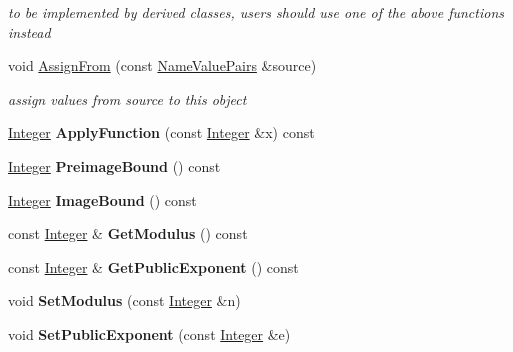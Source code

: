 \begin{DoxyCompactItemize}
\begin{DoxyCompactList}\small\item\em to be implemented by derived classes, users should use one of the above functions instead \item\end{DoxyCompactList}\item 
void \hyperlink{class_e_s_i_g_n_function_a1ff8229ed7786a13a69d15e5a64e4d21}{AssignFrom} (const \hyperlink{class_name_value_pairs}{NameValuePairs} \&source)
\begin{DoxyCompactList}\small\item\em assign values from source to this object \item\end{DoxyCompactList}\item 
\hypertarget{class_e_s_i_g_n_function_a4f97965d2ec6ac022f4d801d1a049905}{
\hyperlink{class_integer}{Integer} {\bfseries ApplyFunction} (const \hyperlink{class_integer}{Integer} \&x) const }
\label{class_e_s_i_g_n_function_a4f97965d2ec6ac022f4d801d1a049905}

\item 
\hypertarget{class_e_s_i_g_n_function_ae007f1b7749980215b32f1643721aa41}{
\hyperlink{class_integer}{Integer} {\bfseries PreimageBound} () const }
\label{class_e_s_i_g_n_function_ae007f1b7749980215b32f1643721aa41}

\item 
\hypertarget{class_e_s_i_g_n_function_aa895825ae14531b6f662437d1a4387c3}{
\hyperlink{class_integer}{Integer} {\bfseries ImageBound} () const }
\label{class_e_s_i_g_n_function_aa895825ae14531b6f662437d1a4387c3}

\item 
\hypertarget{class_e_s_i_g_n_function_ab8c2a9f7f5a90fdfb1ebf4693d956b89}{
const \hyperlink{class_integer}{Integer} \& {\bfseries GetModulus} () const }
\label{class_e_s_i_g_n_function_ab8c2a9f7f5a90fdfb1ebf4693d956b89}

\item 
\hypertarget{class_e_s_i_g_n_function_a0cc92de71e49e8a331a30015f047f553}{
const \hyperlink{class_integer}{Integer} \& {\bfseries GetPublicExponent} () const }
\label{class_e_s_i_g_n_function_a0cc92de71e49e8a331a30015f047f553}

\item 
\hypertarget{class_e_s_i_g_n_function_a5bf2c387bd0724b15af1b0eba8429875}{
void {\bfseries SetModulus} (const \hyperlink{class_integer}{Integer} \&n)}
\label{class_e_s_i_g_n_function_a5bf2c387bd0724b15af1b0eba8429875}

\item 
\hypertarget{class_e_s_i_g_n_function_a5c3a6be0267445a7b6eee4655b67568d}{
void {\bfseries SetPublicExponent} (const \hyperlink{class_integer}{Integer} \&e)}
\label{class_e_s_i_g_n_function_a5c3a6be0267445a7b6eee4655b67568d}

\end{DoxyCompactItemize}
